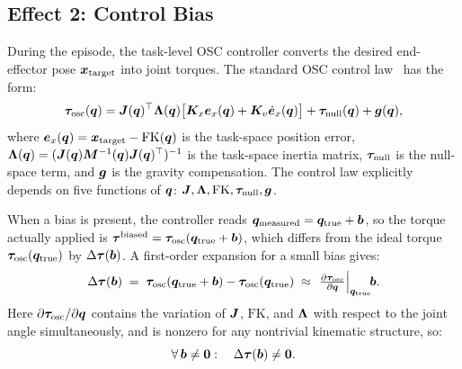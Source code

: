 \subsection{Effect 2: Control Bias}\label{subsec:effect2}

During the episode, the task-level OSC controller converts the desired end-effector pose $\bm{x}_{\text{target}}$ into joint torques. The standard OSC control law~\cite{siciliano2010robotics,ott2008cartesian} has the form:
\begin{equation}
  \bm{\tau}_{\text{osc}}(\bm{q}) = \bm{J}(\bm{q})^\top \bm{\Lambda}(\bm{q})
    \big[\bm{K}_x \bm{e}_x(\bm{q}) + \bm{K}_v \dot{\bm{e}}_x(\bm{q})\big]
    + \bm{\tau}_{\text{null}}(\bm{q}) + \bm{g}(\bm{q}),
  \label{eq:osc_law}
\end{equation}
where $\bm{e}_x(\bm{q}) = \bm{x}_{\text{target}} - \text{FK}(\bm{q})$ is the task-space position error, $\bm{\Lambda}(\bm{q}) = (\bm{J}(\bm{q})\bm{M}^{-1}(\bm{q})\bm{J}(\bm{q})^\top)^{-1}$ is the task-space inertia matrix, $\bm{\tau}_{\text{null}}$ is the null-space term, and $\bm{g}$ is the gravity compensation. The control law explicitly depends on five functions of $\bm{q}$: $\bm{J}, \bm{\Lambda}, \text{FK}, \bm{\tau}_{\text{null}}, \bm{g}$.

When a bias is present, the controller reads $\bm{q}_{\text{measured}} = \bm{q}_{\text{true}} + \bm{b}$, so the torque actually applied is $\bm{\tau}^{\text{biased}} = \bm{\tau}_{\text{osc}}(\bm{q}_{\text{true}} + \bm{b})$, which differs from the ideal torque $\bm{\tau}_{\text{osc}}(\bm{q}_{\text{true}})$ by $\Delta\bm{\tau}(\bm{b})$. A first-order expansion for a small bias gives:
\begin{equation}
  \Delta\bm{\tau}(\bm{b})
  \;=\; \bm{\tau}_{\text{osc}}(\bm{q}_{\text{true}}+\bm{b}) - \bm{\tau}_{\text{osc}}(\bm{q}_{\text{true}})
  \;\approx\; \left.\tfrac{\partial \bm{\tau}_{\text{osc}}}{\partial \bm{q}}\right|_{\bm{q}_{\text{true}}}\!\! \bm{b}.
  \label{eq:tau_linearization}
\end{equation}
Here $\partial \bm{\tau}_{\text{osc}}/\partial \bm{q}$ contains the variation of $\bm{J}$, $\text{FK}$, and $\bm{\Lambda}$ with respect to the joint angle simultaneously, and is nonzero for any nontrivial kinematic structure, so:
\begin{equation}
  \forall\, \bm{b} \neq \bm{0}: \quad \Delta\bm{\tau}(\bm{b}) \neq \bm{0}.
  \label{eq:effect2}
\end{equation}

